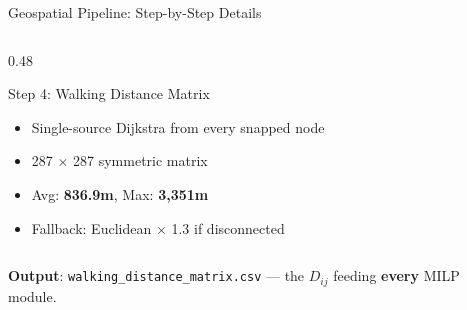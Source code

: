 \documentclass[aspectratio=169]{beamer}
\begin{document}
\begin{frame}{Geospatial Pipeline: Step-by-Step Details}
\begin{columns}[T]
\begin{column}{0.48\textwidth}
            \begin{block}{Step 4: Walking Distance Matrix}
                \begin{itemize}\setlength\itemsep{0pt}
                    \item Single-source Dijkstra from every snapped node
                    \item 287 $\times$ 287 symmetric matrix
                    \item Avg: \textbf{836.9m}, Max: \textbf{3{,}351m}
                    \item Fallback: Euclidean $\times$ 1.3 if disconnected
                \end{itemize}
            \end{block}
        \end{column}
    \end{columns}

    \vspace{0.1cm}
    \centering
    \textbf{Output}: \texttt{walking\_distance\_matrix.csv} --- the $D_{ij}$ feeding \textbf{every} MILP module.
\end{frame}
\end{document}
